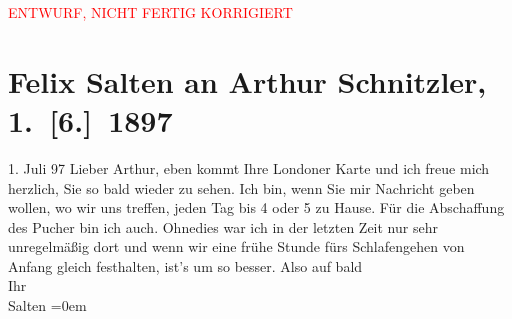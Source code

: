 
\begin{center}
            \textcolor{red}{ENTWURF, NICHT FERTIG KORRIGIERT}
                      \end{center}
            
         \renewcommand{\erwaehnteOrte}{Orte: Café Pucher, London, Wien}
         \renewcommand{\erwaehnteWerke}{}
               \section[Felix Salten an Arthur Schnitzler, 1. {[}6.{]} 1897]{ Felix Salten an Arthur Schnitzler, 1. {[}6.{]} 1897}\nopagebreak{}\rehead{ }\begin{ledgroupsized}[t]{13cm}\normalsize\beginnumbering \toendnotes[C]{\smallbreak\pagebreak[2]} 
\pstart
           {\pb}1. Juli 97\pend
           \pstart
           Lieber Arthur, eben kommt Ihre Londoner Karte und ich freue mich herzlich, Sie so bald wieder zu sehen. Ich
               bin, wenn Sie mir Nachricht geben wollen, wo wir uns treffen, jeden Tag bis 4 oder 5
               zu Hause. Für die Abschaffung des Pucher bin ich
               auch. Ohnedies war ich in der letzten Zeit nur sehr unregelmäßig dort und wenn wir
               eine frühe Stunde fürs Schlafengehen von Anfang gleich festhalten, ist's um so
               besser. \pend
           \pstart
           Also auf bald {\\[\baselineskip]}Ihr {\\[\baselineskip]}\spacefill\mbox{Salten}\pend
           \leftskip=0em{}
         
         \endnumbering{}\end{ledgroupsized}\begin{anhang}\end{anhang}\newcommand{\dateiname}{L03267}\newcommand{\titel}{Felix Salten an Arthur Schnitzler, 1. [6.] 1897}\newcommand{\editorInnen}{Martin Anton Müller und Laura Untner}
      